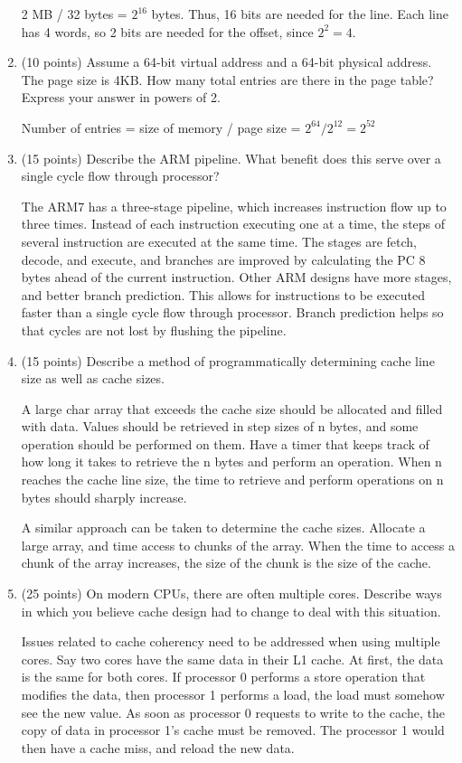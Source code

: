 \documentclass[letterpaper,10pt,onecolumn,titlepage]{article}
\begin{document}
\begin{enumerate}
  2 MB / 32 bytes = $2^{16}$ bytes.  Thus, 16 bits are needed for the line.
  \newline
  Each line has 4 words, so 2 bits are needed for the offset, since $2^2 = 4$.  

\item (10 points) Assume a 64-bit virtual address and a 64-bit physical address. The page
  size is 4KB. How many total entries are there in the page table? Express your answer in
  powers of 2.
  
  Number of entries = size of memory / page size = $2^{64} / 2^{12} = 2^{52}$

\item (15 points) Describe the ARM pipeline. What benefit does this serve over a single 
  cycle flow through processor?
  
  The ARM7 has a three-stage pipeline, which increases instruction flow up to three times.
  Instead of each instruction executing one at a time, the steps of several instruction are executed at the same time.
  The stages are fetch, decode, and execute, and branches are improved by calculating the PC 8 bytes ahead of the current instruction.
  Other ARM designs have more stages, and better branch prediction.
  This allows for instructions to be executed faster than a single cycle flow through processor.
  Branch prediction helps so that cycles are not lost by flushing the pipeline.

\item (15 points) Describe a method of programmatically determining cache line size as 
  well as cache sizes.
  
  A large char array that exceeds the cache size should be allocated and filled with data.
  Values should be retrieved in step sizes of n bytes, and some operation should be performed on them.
  Have a timer that keeps track of how long it takes to retrieve the n bytes and perform an operation.
  When n reaches the cache line size, the time to retrieve and perform operations on n bytes should sharply increase.

  A similar approach can be taken to determine the cache sizes.
  Allocate a large array, and time access to chunks of the array.
  When the time to access a chunk of the array increases, the size of the chunk is the size of the cache.
  
\item (25 points) On modern CPUs, there are often multiple cores. Describe ways in which 
  you believe cache design had to change to deal with this situation.
  
  Issues related to cache coherency need to be addressed when using multiple cores.
  Say two cores have the same data in their L1 cache.
  At first, the data is the same for both cores.
  If processor 0 performs a store operation that modifies the data, then processor 1 performs a load, the load must somehow see the new value.
  As soon as processor 0 requests to write to the cache, the copy of data in processor 1's cache must be removed.
  The processor 1 would then have a cache miss, and reload the new data.
  
\end{enumerate}
\end{document}
